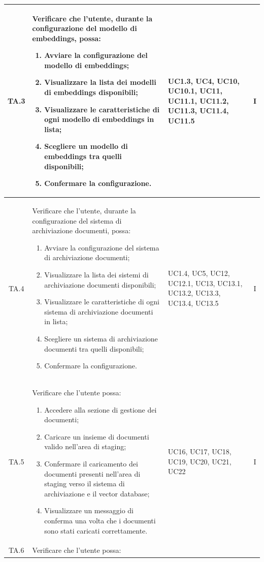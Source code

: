 \documentclass[10pt, a4paper]{article}
\begin{document}
\begin{xltabular}{\textwidth}{|c|X|p{2.5cm}|c|}
\hline
TA.3 & Verificare che l'utente, durante la configurazione del modello di embeddings, possa:
\begin{enumerate}
    \item Avviare la configurazione del modello di embeddings;
    \item Visualizzare la lista dei modelli di embeddings disponibili;
    \item Visualizzare le caratteristiche di ogni modello di embeddings in lista;
    \item Scegliere un modello di embeddings tra quelli disponibili;
    \item Confermare la configurazione.
\end{enumerate}
& UC1.3, UC4, UC10, UC10.1, UC11, UC11.1, UC11.2, UC11.3, UC11.4, UC11.5 & I \\
\hline
TA.4 & Verificare che l'utente, durante la configurazione del sistema di archiviazione documenti, possa:
\begin{enumerate}
    \item Avviare la configurazione del sistema di archiviazione documenti;
    \item Visualizzare la lista dei sistemi di archiviazione documenti disponibili;
    \item Visualizzare le caratteristiche di ogni sistema di archiviazione documenti in lista;
    \item Scegliere un sistema di archiviazione documenti tra quelli disponibili;
    \item Confermare la configurazione.
\end{enumerate}
& UC1.4, UC5, UC12, UC12.1, UC13, UC13.1, UC13.2, UC13.3, UC13.4, UC13.5 & I \\
\hline
TA.5 & Verificare che l'utente possa:
\begin{enumerate}
    \item Accedere alla sezione di gestione dei documenti;
    \item Caricare un insieme di documenti valido nell'area di staging;
    \item Confermare il caricamento dei documenti presenti nell'area di staging verso il sistema di archiviazione e il vector database;
    \item Visualizzare un messaggio di conferma una volta che i documenti sono stati caricati correttamente.
\end{enumerate}
& UC16, UC17, UC18, UC19, UC20, UC21, UC22 & I \\
\hline
TA.6 & Verificare che l'utente possa:

\end{xltabular}
\end{document}
